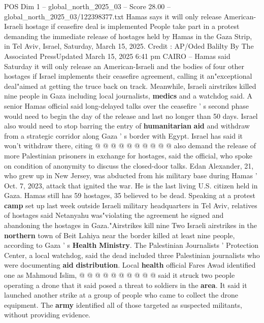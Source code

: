 \begin{textsample}{POS Dim 1 – global\_north\_2025\_03 – Score 28.00 – global\_north\_2025\_03/122398377.txt}  \label{ex:f1_pos_400}
Hamas says it will only release American-Israeli hostage if ceasefire deal is implemented People take part in a protest demanding the immediate release of hostages held by Hamas in the Gaza Strip, in Tel Aviv, Israel, Saturday, March 15, 2025.
Credit : AP/Oded Balilty By The Associated PressUpdated March 15, 2025 6:41 pm CAIRO -- Hamas said Saturday it will only release an American-Israeli and the bodies of four other hostages if Israel implements their ceasefire agreement, calling it an"exceptional deal"aimed at getting the truce back on track.
Meanwhile, Israeli airstrikes killed nine people in Gaza including local journalists, \textbf{medics} and a watchdog said.
A senior Hamas official said long-delayed talks over the ceasefire ' s second phase would need to begin the day of the release and last no longer than 50 days.
Israel also would need to stop barring the entry of \textbf{humanitarian} \textbf{aid} and withdraw from a strategic corridor along Gaza ' s border with Egypt.
Israel has said it won't withdraw there, citing @ @ @ @ @ @ @ @ @ @ also demand the release of more Palestinian prisoners in exchange for hostages, said the official, who spoke on condition of anonymity to discuss the closed-door talks.
Edan Alexander, 21, who grew up in New Jersey, was abducted from his military base during Hamas ' Oct. 7, 2023, attack that ignited the war.
He is the last living U.S. citizen held in Gaza.
Hamas still has 59 hostages, 35 believed to be dead.
Speaking at a protest \textbf{camp} set up last week outside Israeli military headquarters in Tel Aviv, relatives of hostages said Netanyahu was"violating the agreement he signed and abandoning the hostages in Gaza."Airstrikes kill nine Two Israeli airstrikes in the \textbf{northern} town of Beit Lahiya near the border killed at least nine people, according to Gaza ' s \textbf{Health} \textbf{Ministry}.
The Palestinian Journalists ' Protection Center, a local watchdog, said the dead included three Palestinian journalists who were documenting \textbf{aid} \textbf{distribution}.
Local \textbf{health} official Fares Awad identified one as Mahmoud Islim, @ @ @ @ @ @ @ @ @ @ said it struck two people operating a drone that it said posed a threat to soldiers in the \textbf{area}.
It said it launched another strike at a group of people who came to collect the drone equipment.
The \textbf{army} identified all of those targeted as suspected militants, without providing evidence.

\end{textsample}
